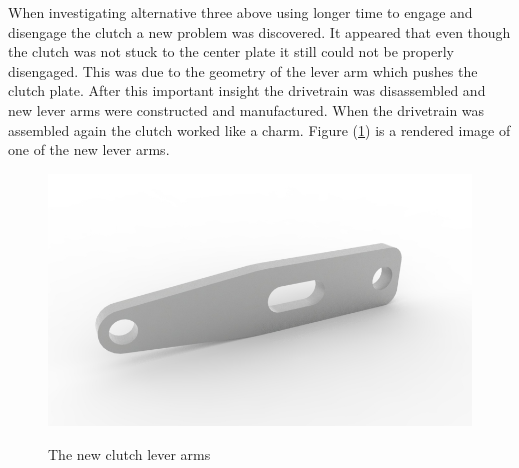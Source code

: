 When investigating alternative three above using longer time to engage and disengage the clutch a new problem was discovered. It appeared that even though the clutch was not stuck to the center plate it still could not be properly disengaged. This was due to the geometry of the lever arm which pushes the clutch plate.  After this important insight the drivetrain was disassembled and new lever arms were constructed and manufactured. When the drivetrain was assembled again the clutch worked like a charm. Figure (\ref{fig:clutch}) is a rendered image of one of the new lever arms.

\begin{figure}[H]
    \centering\label{fig:clutch}
    \includegraphics[width=1\textwidth]{./img/clutch}
    \caption{The new clutch lever arms}
\end{figure}

